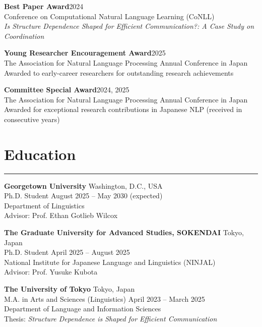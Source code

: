 \documentclass[10pt,a4paper]{article}
\newcommand{\entrygap}{\vspace{6pt}}
\newcommand{\rulegap}{\vspace{6pt}}
\begin{document}
\entrygap

\textbf{Best Paper Award}\hfill{2024} \\
Conference on Computational Natural Language Learning (CoNLL) \\
\textit{Is Structure Dependence Shaped for Efficient Communication?: A Case Study on Coordination}

\entrygap

\textbf{Young Researcher Encouragement Award}\hfill{2025} \\
The Association for Natural Language Processing Annual Conference in Japan \\
Awarded to early-career researchers for outstanding research achievements

\entrygap

\textbf{Committee Special Award}\hfill{2024, 2025} \\
The Association for Natural Language Processing Annual Conference in Japan \\
Awarded for exceptional research contributions in Japanese NLP (received in consecutive years)



\section*{Education}
\hrule
\rulegap

\textbf{Georgetown University}
\hfill{Washington, D.C., USA} \\
Ph.D. Student
\hfill{August 2025 -- May 2030 (expected)} \\
Department of Linguistics \\
Advisor: Prof. Ethan Gotlieb Wilcox


\entrygap

\textbf{The Graduate University for Advanced Studies, SOKENDAI}
\hfill{Tokyo, Japan} \\
Ph.D. Student
\hfill{April 2025 -- August 2025} \\
National Institute for Japanese Language and Linguistics (NINJAL) \\
Advisor: Prof. Yusuke Kubota

\entrygap

\textbf{The University of Tokyo}
\hfill{Tokyo, Japan} \\
M.A. in Arts and Sciences (Linguistics)
\hfill{April 2023 -- March 2025} \\
Department of Language and Information Sciences \\
Thesis: \textit{Structure Dependence is Shaped for Efficient Communication}
\end{document}
